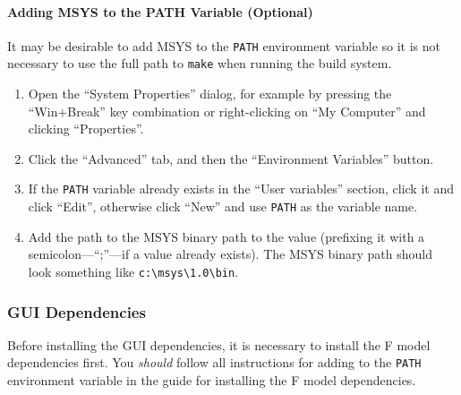\documentclass[10pt,a4paper]{article}
\begin{document}
\paragraph{Adding MSYS to the PATH Variable (Optional)}

It may be desirable to add MSYS to the \verb|PATH| environment variable so it is not necessary to 
use the full path to \verb|make| when running the build system.

\begin{enumerate}

\item Open the ``System Properties'' dialog, for example by pressing the ``Win+Break'' key 
combination or right-clicking on ``My Computer'' and clicking ``Properties''.

\item Click the ``Advanced'' tab, and then the ``Environment Variables'' button.

\item If the \verb|PATH| variable already exists in the ``User variables'' section, click it and 
click ``Edit'', otherwise click ``New'' and use \verb|PATH| as the variable name.

\item Add the path to the MSYS binary path to the value (prefixing it with a semicolon---``;''---if 
a value already exists).  The MSYS binary path should look something like \verb|c:\msys\1.0\bin|.

\end{enumerate}


\subsubsection{GUI Dependencies}

Before installing the GUI dependencies, it is necessary to install the F model dependencies first.  
You \emph{should} follow all instructions for adding to the \verb|PATH| environment variable in the 
guide for installing the F model dependencies.
\end{document}
